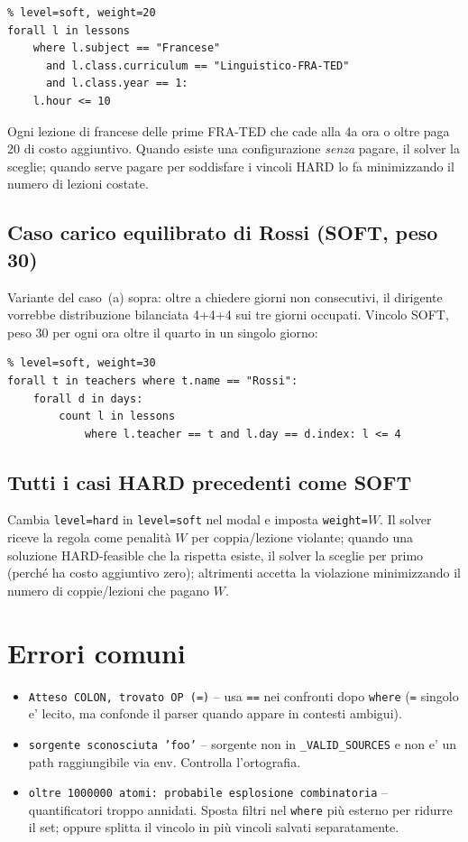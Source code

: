 \begin{lstlisting}
% level=soft, weight=20
forall l in lessons
    where l.subject == "Francese"
      and l.class.curriculum == "Linguistico-FRA-TED"
      and l.class.year == 1:
    l.hour <= 10
\end{lstlisting}

\noindent
Ogni lezione di francese delle prime FRA-TED che cade alla 4a
ora o oltre paga 20 di costo aggiuntivo. Quando esiste una
configurazione \emph{senza} pagare, il solver la sceglie; quando
serve pagare per soddisfare i vincoli HARD lo fa minimizzando il
numero di lezioni costate.

\subsection{Caso carico equilibrato di Rossi (SOFT, peso 30)}

Variante del caso~(a) sopra: oltre a chiedere giorni non
consecutivi, il dirigente vorrebbe distribuzione bilanciata
4+4+4 sui tre giorni occupati. Vincolo SOFT, peso 30 per ogni
ora oltre il quarto in un singolo giorno:

\begin{lstlisting}
% level=soft, weight=30
forall t in teachers where t.name == "Rossi":
    forall d in days:
        count l in lessons
            where l.teacher == t and l.day == d.index: l <= 4
\end{lstlisting}

\subsection{Tutti i casi HARD precedenti come SOFT}

Cambia \texttt{level=hard} in \texttt{level=soft} nel modal e
imposta \texttt{weight=$W$}. Il solver riceve la regola come
penalit\`a $W$ per coppia/lezione violante; quando una soluzione
HARD-feasible che la rispetta esiste, il solver la sceglie per
primo (perch\'e ha costo aggiuntivo zero); altrimenti accetta la
violazione minimizzando il numero di coppie/lezioni che pagano
$W$.

\section{Errori comuni}

\begin{itemize}
\item \texttt{Atteso COLON, trovato OP (=)} -- usa \texttt{==}
nei confronti dopo \texttt{where} (\texttt{=} singolo e' lecito,
ma confonde il parser quando appare in contesti ambigui).
\item \texttt{sorgente sconosciuta 'foo'} -- sorgente non in
\texttt{\_VALID\_SOURCES} e non e' un path raggiungibile via
env. Controlla l'ortografia.
\item \texttt{oltre 1000000 atomi: probabile esplosione
combinatoria} -- quantificatori troppo annidati. Sposta filtri
nel \texttt{where} pi\`u esterno per ridurre il set; oppure
splitta il vincolo in pi\`u vincoli salvati separatamente.
\end{itemize}

